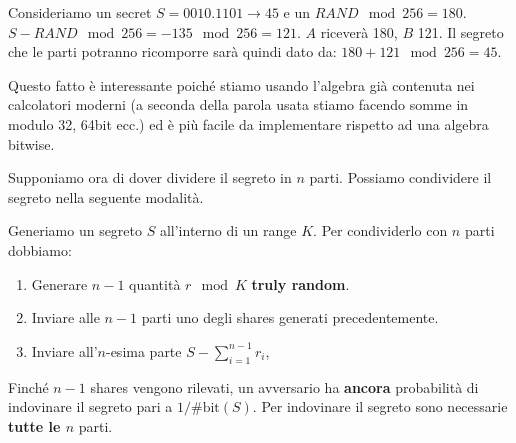 \begin{example}
Consideriamo un secret $S=0010.1101\rightarrow 45$ e un $RAND\mod256=180$. $S-RAND\mod{256}=-135\mod{256}=121$. $A$ riceverà 180, $B$ 121. Il segreto che le parti potranno ricomporre sarà quindi dato da: $180+121\mod{256}=45$.
\end{example}
\begin{note}
Questo fatto è interessante poiché stiamo usando l'algebra già contenuta nei calcolatori moderni (a seconda della parola usata stiamo facendo somme in modulo 32, 64bit ecc.) ed è più facile da implementare rispetto ad una algebra bitwise.
\end{note}
Supponiamo ora di dover dividere il segreto in $n$ parti. Possiamo condividere il segreto nella seguente modalità.
\begin{theorem}\label{thm:trivialsecret}
Generiamo un segreto $S$ all'interno di un range $K$. Per condividerlo con $n$ parti dobbiamo:
\begin{enumerate}
    \item Generare $n-1$ quantità $r\mod{K}$ \textbf{truly random}.
    \item Inviare alle $n-1$ parti uno degli shares generati precedentemente.
    \item Inviare all'$n$-esima parte $S-\sum_{i=1}^{n-1}{r_i}$,
\end{enumerate}
Finché $n-1$ shares vengono rilevati, un avversario ha \textbf{ancora} probabilità di indovinare il segreto pari a $1/\text{\#bit}(S)$. Per indovinare il segreto sono necessarie \textbf{tutte le $n$} parti.
\end{theorem}
